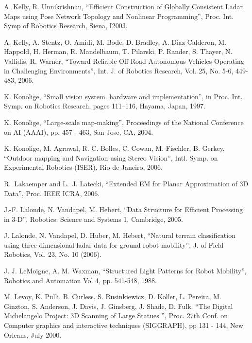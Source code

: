 \documentclass[twocolumn,oneside]{book}
\begin{document}
\begin{thebibliography}{99}
A. Kelly, R. Unnikrishnan,
``Efficient Construction of Globally Consistent Ladar Maps using Pose Network Topology
and Nonlinear Programming'',
Proc. Int. Symp of Robotics Research, Siena, I2003.

A. Kelly, A. Stentz, O. Amidi, M. Bode, D. Bradley, A. Diaz-Calderon, M. Happold, H. Herman, R. Mandelbaum,
T. Pilarski, P. Rander, S. Thayer, N. Vallidis, R. Warner,
``Toward Reliable Off Road Autonomous Vehicles Operating in Challenging Environments'',
Int. J. of Robotics Research, Vol. 25, No. 5-6, 449-483, 2006.


K. Konolige,
``Small vision system. hardware and implementation'',
in Proc. Int. Symp. on Robotics Research, pages 111--116,
Hayama, Japan, 1997.


K. Konolige,
``Large-scale map-making'',
Proceedings of the National Conference on AI (AAAI), pp. 457 - 463, San Jose, CA, 2004.

K. Konolige, M. Agrawal, R. C. Bolles, C. Cowan, M. Fischler, B. Gerkey,
``Outdoor mapping and Navigation using Stereo Vision'',
Intl. Symp. on Experimental Robotics (ISER), Rio de Janeiro, 2006.

R.~Lakaemper and L.~J. Latecki,
``Extended EM for Planar Approximation of 3D Data'',
Proc. IEEE ICRA, 2006.

J.-F. Lalonde, N. Vandapel, M. Hebert,
``Data Structure for Efficient Processing in 3-D'',
Robotics: Science and Systems 1, Cambridge, 2005.

J. Lalonde, N. Vandapel, D. Huber, M. Hebert,
``Natural terrain classification using three-dimensional ladar data
for ground robot mobility'',
J. of Field Robotics, Vol. 23, No. 10 (2006).

J. J. LeMoigne, A. M. Waxman, 
``Structured Light Patterns for Robot Mobility'',
Robotics and Automation Vol 4, pp. 541-548, 1988.

M. Levoy, K. Pulli, B. Curless, S. Rusinkiewicz, D. Koller, L. Pereira, M. Ginzton, S. Anderson, J. Davis, J. Ginsberg, J. Shade, D. Fulk.
``The Digital Michelangelo Project: 3D Scanning of Large Statues '',
Proc. 27th Conf. on Computer graphics and interactive techniques
(SIGGRAPH), pp 131 - 144, New Orleans, July 2000.


\end{thebibliography}
\end{document}
